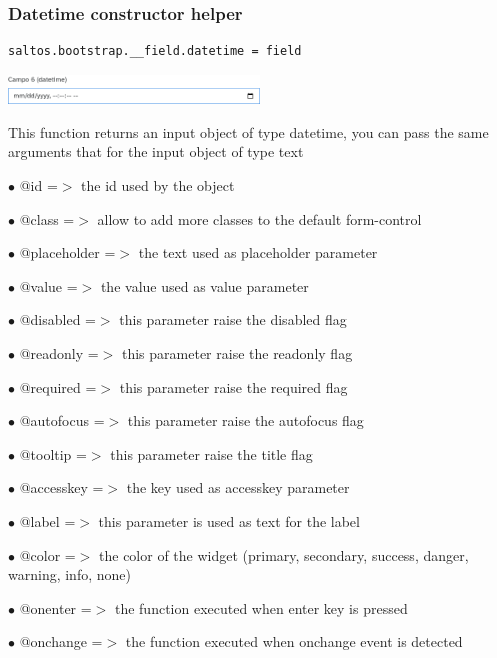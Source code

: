 \documentclass[a4paper]{article}
\begin{document}
\hypertarget{toc57}{}
\subsubsection{Datetime constructor helper}

\begin{lstlisting}
saltos.bootstrap.__field.datetime = field
\end{lstlisting}

\begin{center}\includegraphics[width=0.5\textwidth]{../ujest/snaps/test-bootstrap-js-bootstrap-campo-6-datetime-1-snap.png}\end{center}

This function returns an input object of type datetime, you can pass the same arguments
that for the input object of type text

\begin{compactitem}
\item[\color{myblue}$\bullet$] @id          =$>$ the id used by the object
\item[\color{myblue}$\bullet$] @class       =$>$ allow to add more classes to the default form-control
\item[\color{myblue}$\bullet$] @placeholder =$>$ the text used as placeholder parameter
\item[\color{myblue}$\bullet$] @value       =$>$ the value used as value parameter
\item[\color{myblue}$\bullet$] @disabled    =$>$ this parameter raise the disabled flag
\item[\color{myblue}$\bullet$] @readonly    =$>$ this parameter raise the readonly flag
\item[\color{myblue}$\bullet$] @required    =$>$ this parameter raise the required flag
\item[\color{myblue}$\bullet$] @autofocus   =$>$ this parameter raise the autofocus flag
\item[\color{myblue}$\bullet$] @tooltip     =$>$ this parameter raise the title flag
\item[\color{myblue}$\bullet$] @accesskey   =$>$ the key used as accesskey parameter
\item[\color{myblue}$\bullet$] @label       =$>$ this parameter is used as text for the label
\item[\color{myblue}$\bullet$] @color       =$>$ the color of the widget (primary, secondary, success, danger, warning, info, none)
\item[\color{myblue}$\bullet$] @onenter     =$>$ the function executed when enter key is pressed
\item[\color{myblue}$\bullet$] @onchange    =$>$ the function executed when onchange event is detected
\end{compactitem}
\end{document}
